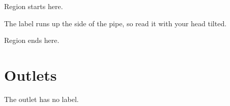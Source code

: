 \documentclass[11pt]{article}
\begin{document}
Region starts here.

The label  runs up the side of the pipe, so read it with your head tilted.

Region ends here.

\section{Outlets}
The outlet has no label.
\end{document}
